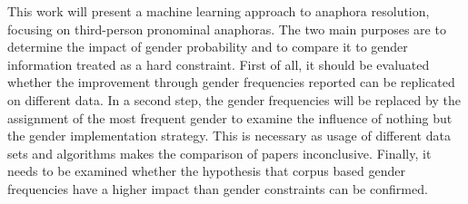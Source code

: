 This work will present a machine learning approach to anaphora resolution, focusing on third-person pronominal anaphoras. The two main purposes are to determine the impact of gender probability and to compare it to gender information treated as a hard constraint. First of all, it should be evaluated whether the improvement through gender frequencies \cite{bergsma2005automatic} reported can be replicated on different data. In a second step, the gender frequencies will be replaced by the assignment of the most frequent gender to examine the influence of nothing but the gender implementation strategy. This is necessary as usage of different data sets and algorithms makes the comparison of papers inconclusive. Finally, it needs to be examined whether the hypothesis that corpus based gender frequencies have a higher impact than gender constraints can be confirmed.

